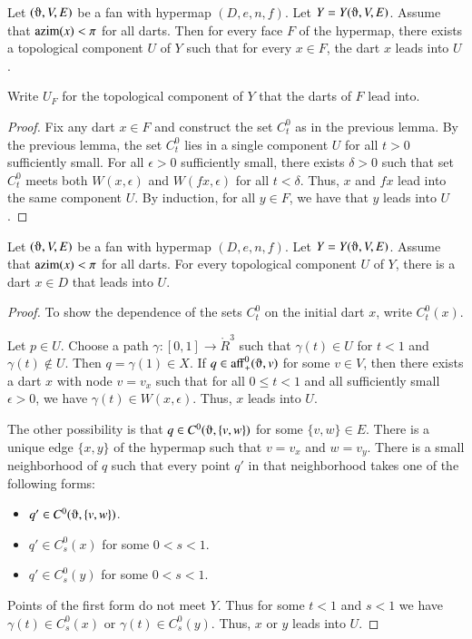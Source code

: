 \begin{lemma} 
Let $(\orgn,V,E)$ be a fan with hypermap $(D,e,n,f)$. Let $Y=Y(\orgn,V,E)$. Assume that ${\operatorname{azim}}(x)<\pi$ for all darts. Then for every face $F$ of the hypermap, there exists a topological component $U$ of $Y$ such that for every $x\in F$, the dart $x$ leads into $U$. 
\end{lemma}

Write $U_F$ for the topological component of $Y$ that the darts of $F$ lead into.


\begin{proof}  Fix any dart $x\in F$ and construct the set $C^0_t$ as
in the previous lemma.  By the previous lemma, the set $C^0_t$ lies in a single
component $U$ for all $t>0$ sufficiently small.  For all $\epsilon>0$
sufficiently small, there exists $\delta>0$ such that set $C^0_t$ meets
both $W(x,\epsilon)$ and $W(f x,\epsilon)$ for all $t<\delta$.  Thus,
$x$ and $f x$ lead into the same component $U$.  By induction, for all
$y\in F$, we have that $y$ leads into $U$.
\end{proof}

\begin{lemma}
Let $(\orgn,V,E)$ be a fan with hypermap $(D,e,n,f)$. Let $Y=Y(\orgn,V,E)$. Assume that ${\operatorname{azim}}(x)<\pi$ for all darts.  For every topological component $U$ of $Y$, there is a dart $x\in D$ that leads into $U$.
\end{lemma}

\begin{proof}  
To show the dependence of the sets $C^0_t$ on the initial dart $x$, write $C^0_t(x)$.

Let $p\in U$.  Choose a path $\gamma:[0,1]\to \ring{R}^3$
such that $\gamma(t)\in U$ for $t<1$ and $\gamma(t)\not\in U$.  Then
$q=\gamma(1)\in X$.  If $q\in\op{aff}^0_+(\orgn,v)$ for some $v\in V$,
then there exists a dart $x$ with node $v = v_x$ such that for 
all $0\le t < 1$ and all sufficiently
small $\epsilon>0$, we have $\gamma(t)\in W(x,\epsilon)$.  Thus,
$x$ leads into $U$.

The other possibility is that
$q\in C^0(\orgn,\{v,w\})$ for some $\{v,w\}\in E$.  There is a unique
edge $\{x,y\}$ of the hypermap such that $v=v_x$ and $w=v_y$.  
There
is a small neighborhood of $q$ such that every point $q'$ in that neighborhood
takes one of the following forms:
\begin{itemize} \item $q'\in C^0(\orgn,\{v,w\})$.
\item $q'\in C^0_s(x)$ for some $0<s<1$.
\item $q'\in C^0_s(y)$ for some $0<s<1$.
\end{itemize}
Points of the first form do not meet $Y$.  Thus for some $t<1$ and $s<1$
we have $\gamma(t)\in C^0_s(x)$ or $\gamma(t)\in C^0_s(y)$.  Thus,
$x$ or $y$ leads into $U$.
\end{proof}

